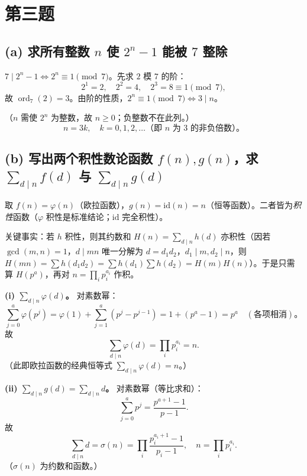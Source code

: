 \documentclass{article}
\newcommand{\ord}{\operatorname{ord}}
\begin{document}
\section{第三题}

\subsection*{(a) 求所有整数 $n$ 使 $2^{n}-1$ 能被 $7$ 整除}

\begin{solution}
$7\mid 2^{n}-1\iff 2^{n}\equiv 1\pmod 7$。先求 $2$ 模 $7$ 的阶：
\[
  2^{1}=2,\quad 2^{2}=4,\quad 2^{3}=8\equiv 1\pmod 7,
\]
故 $\ord_{7}(2)=3$。由阶的性质，$2^{n}\equiv 1\pmod 7\iff 3\mid n$。

（$n$ 需使 $2^{n}$ 为整数，故 $n\ge 0$；负整数不在此列。）
\[
  \boxed{n=3k,\quad k=0,1,2,\dots\text{（即 }n\text{ 为 }3\text{ 的非负倍数）。}}
\]
\end{solution}

\subsection*{(b) 写出两个积性数论函数 $f(n),g(n)$，求 $\sum_{d\mid n}f(d)$ 与 $\sum_{d\mid n}g(d)$}

\begin{solution}
取 $f(n)=\varphi(n)$（欧拉函数），$g(n)=\mathrm{id}(n)=n$（恒等函数）。二者皆为\emph{积性}函数（$\varphi$ 积性是标准结论；$\mathrm{id}$ 完全积性）。

关键事实：若 $h$ 积性，则其约数和 $H(n)=\sum_{d\mid n}h(d)$ 亦积性（因若 $\gcd(m,n)=1$，$d\mid mn$ 唯一分解为 $d=d_1d_2$，$d_1\mid m,d_2\mid n$，则 $H(mn)=\sum h(d_1d_2)=\sum h(d_1)\sum h(d_2)=H(m)H(n)$）。于是只需算 $H(p^{a})$，再对 $n=\prod_i p_i^{a_i}$ 作积。

\medskip
\noindent\textbf{(i) $\sum_{d\mid n}\varphi(d)$。} 对素数幂：
\[
  \sum_{j=0}^{a}\varphi(p^{j})=\varphi(1)+\sum_{j=1}^{a}(p^{j}-p^{j-1})
  =1+(p^{a}-1)=p^{a}\quad(\text{各项相消})。
\]
故
\[
  \boxed{\;\sum_{d\mid n}\varphi(d)=\prod_i p_i^{a_i}=n.\;}
\]
（此即欧拉函数的经典恒等式 $\sum_{d\mid n}\varphi(d)=n$。）

\medskip
\noindent\textbf{(ii) $\sum_{d\mid n}g(d)=\sum_{d\mid n}d$。} 对素数幂（等比求和）：
\[
  \sum_{j=0}^{a}p^{j}=\frac{p^{a+1}-1}{p-1}.
\]
故
\[
  \boxed{\;\sum_{d\mid n}d=\sigma(n)=\prod_i\frac{p_i^{a_i+1}-1}{p_i-1},\quad n=\prod_i p_i^{a_i}.\;}
\]
（$\sigma(n)$ 为约数和函数。）
\end{solution}
\end{document}
